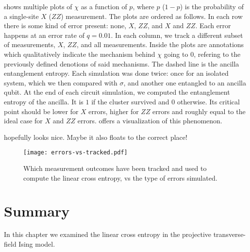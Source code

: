  shows multiple plots of $\chi$ as a function of
$p$, where $p$ ($1-p$) is the probability of a single-site $X$ ($ZZ$)
measurement. The plots are ordered as follows. In each row there is some kind of
error present: none, $X$, $ZZ$, and $X$ and $ZZ$. Each error happens at an
error rate of $q=0.01$. In each column, we track a different subset of
measurements, $X$, $ZZ$, and all measurements.
Inside the plots are annotations which qualitatively
indicate the mechanism behind $\chi$ going to $0$, refering to the previously
defined denotions of said mechanisms. The dashed line is the ancilla
entanglement entropy. Each simulation was done twice: once for an isolated
system, which we then compared with $\sigma$, and another one entangled to an
ancilla qubit. At the end of each circuit simulation, we computed the
entanglement entropy of the ancilla. It is $1$ if the cluster survived and $0$
otherwise. Its critical point should be lower for $X$ errors, higher for $ZZ$
errors and roughly equal to the ideal case for $X$ and $ZZ$ errors.
 offers a visualization of this phenomenon.

 hopefully looks nice. Maybe it also floats to the correct
place!
\begin{figure}[p]
  \centering
  \texttt{[image: errors-vs-tracked.pdf]}
  \caption{Which measurement outcomes have been tracked and used to compute the
  linear cross entropy, vs the type of errors simulated.}
  \label{fig:err-vs-tra}
\end{figure}
\newpage
\section{Summary}
In this chapter we examined the linear cross entropy in the projective
transverse-field Ising model. 
